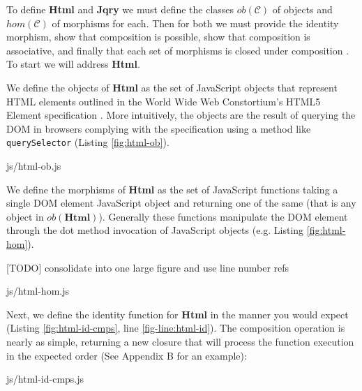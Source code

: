 \documentclass[preprint]{sigplanconf}
\begin{document}
To define \textbf{Html} and \textbf{Jqry} we must define the classes \begin{math}ob(\mathcal{C})\end{math} of objects and \begin{math}hom(\mathcal{C})\end{math} of morphisms for each. Then for both we must provide the identity morphism, show that composition is possible, show that composition is associative, and finally that each set of morphisms is closed under composition \cite[p. ~1]{bib:category-definition}. To start we will address \textbf{Html}.

We define the objects of \textbf{Html} as the set of JavaScript objects that represent HTML elements outlined in the World Wide Web Constortium's HTML5 Element specification \cite{bib:dom}. More intuitively, the objects are the result of querying the DOM in browsers complying with the specification using a method like \verb|querySelector| (Listing \ref{fig:html-ob}).

\begin{lstinputlisting}[
    language=JavaScript,
    caption={Sources of Html objects},
    label={fig:html-ob}
]{js/html-ob.js}
\end{lstinputlisting}

We define the morphisms of \textbf{Html} as the set of JavaScript functions taking a single DOM element JavaScript object and returning one of the same (that is any object in \begin{math}ob(\mathbf{Html})\end{math}). Generally these functions manipulate the DOM element through the dot method invocation of JavaScript objects (e.g. Listing \ref{fig:html-hom}).

[TODO] consolidate into one large figure and use line number refs

\begin{lstinputlisting}[
    language=JavaScript,
    label={fig:html-hom}
]{js/html-hom.js}
\end{lstinputlisting}

Next, we define the identity function for \textbf{Html} in the manner you would expect (Listing \ref{fig:html-id-cmps}, line \ref{fig-line:html-id}). The composition operation is nearly as simple, returning a new closure that will process the function execution in the expected order (See Appendix B for an example):

\begin{lstinputlisting}[
    language=JavaScript,
    label={fig:html-id-cmps},
    escapeinside={@}{@}
]{js/html-id-cmps.js}
\end{lstinputlisting}
\end{document}
